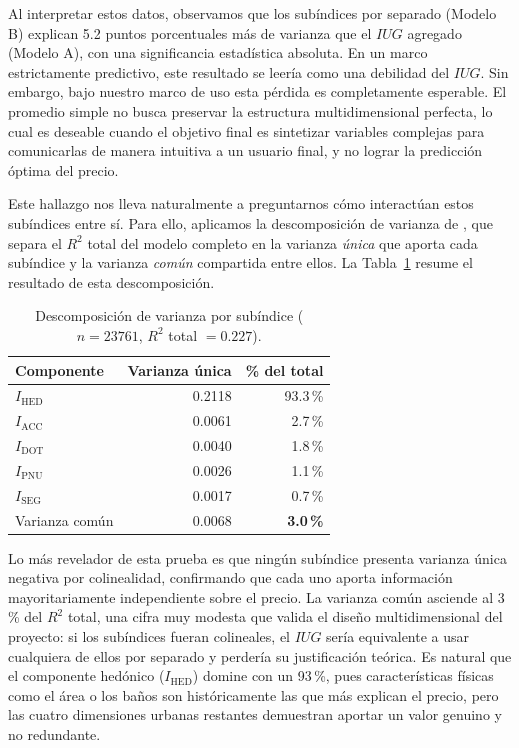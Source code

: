 \documentclass[12pt, a4paper, twoside, openright]{report}
\theoremstyle{plain}
\theoremstyle{definition}
\newcommand{\IHED}{I_{\text{HED}}} %
\newcommand{\IACC}{I_{\text{ACC}}} %
\newcommand{\ISEG}{I_{\text{SEG}}} %
\newcommand{\IDOT}{I_{\text{DOT}}} %
\newcommand{\IPNU}{I_{\text{PNU}}} %
\newcommand{\IUG}{IUG}             %
\begin{document}
Al interpretar estos datos, observamos que los subíndices por separado (Modelo B) explican 5.2 puntos porcentuales más de varianza que el $\IUG$ agregado (Modelo A), con una significancia estadística absoluta. En un marco estrictamente predictivo, este resultado se leería como una debilidad del $\IUG$. Sin embargo, bajo nuestro marco de uso esta pérdida es completamente esperable. El promedio simple no busca preservar la estructura multidimensional perfecta, lo cual es deseable cuando el objetivo final es sintetizar variables complejas para comunicarlas de manera intuitiva a un usuario final, y no lograr la predicción óptima del precio.

Este hallazgo nos lleva naturalmente a preguntarnos cómo interactúan estos subíndices entre sí. Para ello, aplicamos la descomposición de varianza de \citet{nimon2013}, que separa el $R^2$ total del modelo completo en la varianza \emph{única} que aporta cada subíndice y la varianza \emph{común} compartida entre ellos. La Tabla~\ref{tab:commonality_validez} resume el resultado de esta descomposición.

\begin{table}[htbp]
\centering
\caption{Descomposición de varianza por subíndice ($n = \num{23761}$, $R^2$ total $= 0.227$).}
\label{tab:commonality_validez}
\small
\begin{tabular}{@{}lrr@{}}
\toprule
\textbf{Componente} & \textbf{Varianza única} & \textbf{\% del total} \\
\midrule
$\IHED$ & 0.2118 & 93.3\,\% \\
$\IACC$ & 0.0061 & 2.7\,\% \\
$\IDOT$ & 0.0040 & 1.8\,\% \\
$\IPNU$ & 0.0026 & 1.1\,\% \\
$\ISEG$ & 0.0017 & 0.7\,\% \\
\midrule
Varianza común & 0.0068 & \textbf{3.0\,\%} \\
\bottomrule
\end{tabular}
\end{table}

Lo más revelador de esta prueba es que ningún subíndice presenta varianza única negativa por colinealidad, confirmando que cada uno aporta información mayoritariamente independiente sobre el precio. La varianza común asciende al 3\,\% del $R^2$ total, una cifra muy modesta que valida el diseño multidimensional del proyecto: si los subíndices fueran colineales, el $\IUG$ sería equivalente a usar cualquiera de ellos por separado y perdería su justificación teórica. Es natural que el componente hedónico ($\IHED$) domine con un 93\,\%, pues características físicas como el área o los baños son históricamente las que más explican el precio, pero las cuatro dimensiones urbanas restantes demuestran aportar un valor genuino y no redundante.
\end{document}

